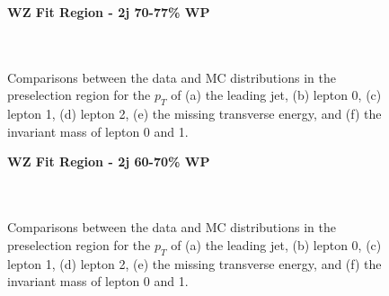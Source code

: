 \begin{figure}[H]
    \centering
    \textbf{WZ Fit Region - 2j 70-77\% WP}\\
    \\
    \\
    \caption{Comparisons between the data and MC distributions in the preselection region for the $p_T$ of (a) the leading jet, (b) lepton 0, (c) lepton 1, (d) lepton 2, (e) the missing transverse energy, and (f) the invariant mass of lepton 0 and 1.}
    \label{kin:WP_2j_70_77}
\end{figure}

\begin{figure}[H]
    \centering
    \textbf{WZ Fit Region - 2j 60-70\% WP}\\
    \\
    \\
    \caption{Comparisons between the data and MC distributions in the preselection region for the $p_T$ of (a) the leading jet, (b) lepton 0, (c) lepton 1, (d) lepton 2, (e) the missing transverse energy, and (f) the invariant mass of lepton 0 and 1.}
    \label{kin:WP_2j_60_70}
\end{figure}

